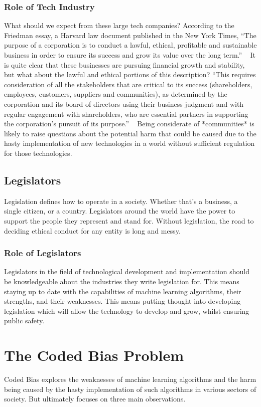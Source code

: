 \documentclass[sigconf, 10pt]{acmart}
\begin{document}
\subsubsection{Role of Tech Industry}
What should we expect from these large tech companies? According to the Friedman essay, a Harvard law document published in the New York Times, “The purpose of a corporation is to conduct a lawful, ethical, profitable and sustainable business in order to ensure its success and grow its value over the long term.” ~\cite{used_ninth(8)} It is quite clear that these businesses are pursuing financial growth and stability, but what about the lawful and ethical portions of this description? “This requires consideration of all the stakeholders that are critical to its success (shareholders, employees, customers, suppliers and communities), as determined by the corporation and its board of directors using their business judgment and with regular engagement with shareholders, who are essential partners in supporting the corporation’s pursuit of its purpose.” ~\cite{used_ninth(8)} Being considerate of *communities* is likely to raise questions about the potential harm that could be caused due to the hasty implementation of new technologies in a world without sufficient regulation for those technologies.
\subsection{Legislators}
Legislation defines how to operate in a society. Whether that’s a business, a single citizen, or a country. Legislators around the world have the power to support the people they represent and stand for. Without legislation, the road to deciding ethical conduct for any entity is long and messy.
\subsubsection{Role of Legislators}
Legislators in the field of technological development and implementation should be knowledgeable about the industries they write legislation for. This means staying up to date with the capabilities of machine learning algorithms, their strengths, and their weaknesses. This means putting thought into developing legislation which will allow the technology to develop and grow, whilst ensuring public safety.
\section{The Coded Bias Problem}
Coded Bias explores the weaknesses of machine learning algorithms and the harm being caused by the hasty implementation of such algorithms in various sectors of society. But ultimately focuses on three main observations.
\end{document}
